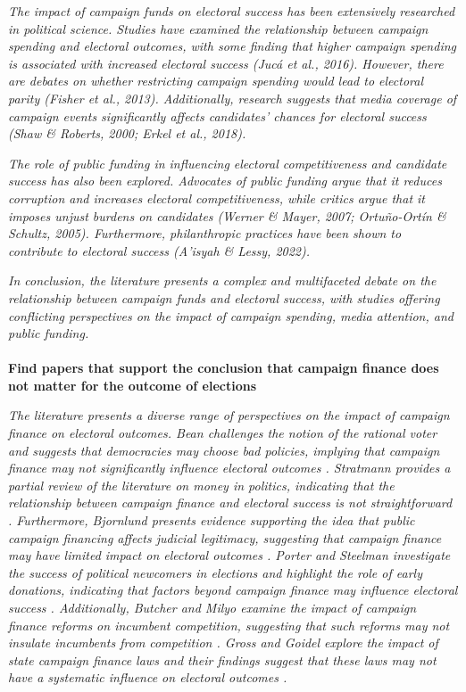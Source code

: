 \documentclass[11pt,a4paper]{article}
\begin{document}
\textit{The impact of campaign funds on electoral success has been extensively researched in political science. Studies have examined the relationship between campaign spending and electoral outcomes, with some finding that higher campaign spending is associated with increased electoral success (Jucá et al., 2016). However, there are debates on whether restricting campaign spending would lead to electoral parity (Fisher et al., 2013). Additionally, research suggests that media coverage of campaign events significantly affects candidates' chances for electoral success (Shaw \& Roberts, 2000; Erkel et al., 2018).}

 \textit{The role of public funding in influencing electoral competitiveness and candidate success has also been explored. Advocates of public funding argue that it reduces corruption and increases electoral competitiveness, while critics argue that it imposes unjust burdens on candidates (Werner \& Mayer, 2007; Ortuño-Ortín \& Schultz, 2005). Furthermore, philanthropic practices have been shown to contribute to electoral success (A'isyah \& Lessy, 2022).}

 \textit{In conclusion, the literature presents a complex and multifaceted debate on the relationship between campaign funds and electoral success, with studies offering conflicting perspectives on the impact of campaign spending, media attention, and public funding.}
\\
\\
 \textbf{Find papers that support the conclusion that campaign finance does not matter for the outcome of elections}

\textit{The literature presents a diverse range of perspectives on the impact of campaign finance on electoral outcomes. Bean challenges the notion of the rational voter and suggests that democracies may choose bad policies, implying that campaign finance may not significantly influence electoral outcomes . Stratmann provides a partial review of the literature on money in politics, indicating that the relationship between campaign finance and electoral success is not straightforward . Furthermore, Bjornlund presents evidence supporting the idea that public campaign financing affects judicial legitimacy, suggesting that campaign finance may have limited impact on electoral outcomes . Porter and Steelman investigate the success of political newcomers in elections and highlight the role of early donations, indicating that factors beyond campaign finance may influence electoral success . Additionally, Butcher and Milyo examine the impact of campaign finance reforms on incumbent competition, suggesting that such reforms may not insulate incumbents from competition . Gross and Goidel explore the impact of state campaign finance laws and their findings suggest that these laws may not have a systematic influence on electoral outcomes .}
\end{document}
